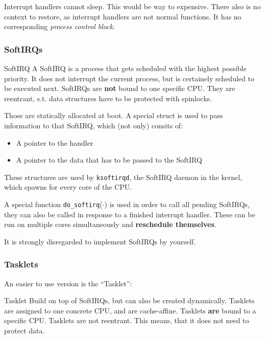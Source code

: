 \documentclass[english]{panikzettel}
\newcommand{\fkt}[1]{\texttt{#1}(\(\cdot\))}
\begin{document}
	\begin{alertbox}
		Interrupt handlers cannot sleep. 
		This would be way to expensive.
		There also is no context to restore, as interrupt handlers are not normal functions. 
		It has no corresponding \textit{process control block}.
	\end{alertbox}
	
	\subsubsection{SoftIRQs}
	\label{sss-softirqs}
	
	\begin{defi}{SoftIRQ}
		A SoftIRQ is a process that gets scheduled with the highest possible priority. It does not interrupt the current process, but is certainely scheduled to be executed next.
		\tcblower
		SoftIRQs are \textbf{not} bound to one specific CPU.
		They are reentrant, s.t. data structures have to be protected with spinlocks.
	\end{defi}

	Those are statically allocated at boot. 
	A special struct is used to pass information to that SoftIRQ, which (not only) consits of:
	\begin{itemize}
		\item A pointer to the handler
		\item A pointer to the data that has to be passed to the SoftIRQ
	\end{itemize}

	These structures are used by \texttt{ksoftirqd}, the SoftIRQ daemon in the kernel, which spawns for every core of the CPU.

	A special function \fkt{do\_softirq} is used in order to call all pending SoftIRQs, they can also be called in response to a finished interrupt handler.
	These can be run on multiple cores simultaneously and \textbf{reschedule themselves}.

	It is strongly disregarded to implement SoftIRQs by yourself.

	\subsubsection{Tasklets}
	\label{sss-tasklets}
	
	An easier to use version is the \enquote{Tasklet}:

	\begin{defi}{Tasklet}
		Build on top of SoftIRQs, but can also be created dynamically.
		Tasklets are assigned to one concrete CPU, and are cache-affine.
		\tcblower
		Tasklets \textbf{are} bound to a specific CPU.
		Tasklets are not reentrant.
		This means, that it does not need to protect data.
	\end{defi}
\end{document}
